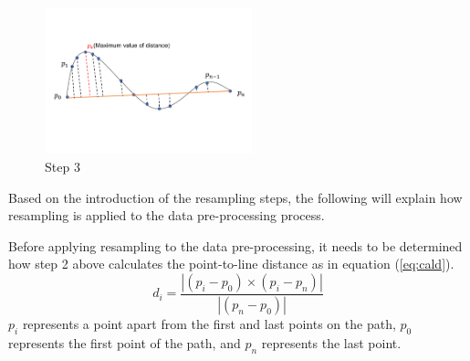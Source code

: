\begin{figure}[h!]
	\centering
        \vspace{-1.7cm}
        \setlength{\abovecaptionskip}{-1cm}
	\includegraphics[width=6cm]{03_images/sampling_3.pdf}
	\caption{Step 3}
	\label{fig:main:sampling3}
\end{figure}
Based on the introduction of the resampling steps, the following will explain how resampling is applied to the data pre-processing process.\par
Before applying resampling to the data pre-processing, it needs to be determined how step 2 above calculates the point-to-line distance as in equation (\ref{eq:cald}). 
\begin{equation}
   d_{i} = \frac{\left|(p_{i}-p_{0}) \times (p_{i}-p_{n})\right|}{\left|(p_{n}-p_{0})\right|} 
\label{eq:cald}
\end{equation}
$p_{i}$ represents a point apart from the first and last points on the path, $p_{0}$ represents the first point of the path, and $p_{n}$ represents the last point. \par
